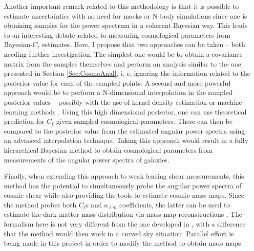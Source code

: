\qquad Another important remark related to this methodology is that it is possible to estimate uncertainties with no need for mocks or N-body simulations since one is obtaining samples for the power spectrum in a coherent Bayesian way. This leads to an interesting debate related to measuring cosmological parameters from Bayesian-$C_{\ell}$ estimates. Here, I propose that two approaches can be taken -- both needing further investigation. The simplest one would be to obtain a covariance matrix from the samples themselves and perform an analysis similar to the one presented in Section \ref{Sec:CosmoAnal}, i. e. ignoring the information related to the posterior value for each of the sampled points. A second and more powerful approach would be to perform a N-dimensional interpolation in the sampled posterior values -- possibly with the use of kernel density estimation \citep{rosenblatt1969multivariate,2011-Density-Estim} or machine learning methods \citep{2010-ML-Review-Astro,2015-KDE-Izbicki}. Using this high dimensional posterior, one can use theoretical prediction for $C_{\ell}$ given sampled cosmological parameters. These can then be compared to the posterior value from the estimated angular power spectra using an advanced interpolation technique. Taking this approach would result in a fully hierarchical Bayesian method to obtain cosmological parameters from measurements of the angular power spectra of galaxies. 

\qquad Finally, when extending this approach to weak lensing shear measurements, this method has the potential to simultaneously probe the angular power spectra of cosmic shear while also providing the tools to estimate cosmic mass maps. Since the method probes both $C_{\ell}$s and $a_{\ell m}$ coefficients, the latter can be used to estimate the dark matter mass distribution via mass map reconstructions \citep{2018Niall}. The formalism here is not very different from the one developed in \cite{AlmostBlackPearl2016}, with a difference that the method would then work in a curved sky situation. Parallel effort is being made in this project in order to modify the method to obtain mass maps.